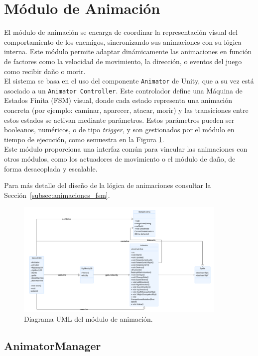 \section{Módulo de Animación} \label{sec:animation}

El módulo de animación se encarga de coordinar la representación visual del comportamiento de los enemigos, sincronizando sus animaciones con su lógica interna. Este módulo permite adaptar dinámicamente las animaciones en función de factores como la velocidad de movimiento, la dirección, o eventos del juego como recibir daño o morir.\\

El sistema se basa en el uso del componente \texttt{Animator} de Unity, que a su vez está asociado a un \texttt{Animator Controller}. Este controlador define una Máquina de Estados Finita (FSM) visual, donde cada estado representa una animación concreta (por ejemplo: caminar, aparecer, atacar, morir) y las transiciones entre estos estados se activan mediante parámetros. Estos parámetros pueden ser booleanos, numéricos, o de tipo \textit{trigger}, y son gestionados por el módulo en tiempo de ejecución, como semuestra en la Figura \ref{fig:UMLAnimation}.\\

Este módulo proporciona una interfaz común para vincular las animaciones con otros módulos, como los actuadores de movimiento o el módulo de daño, de forma desacoplada y escalable.

Para más detalle del diseño de la lógica de animaciones consultar la Sección~\ref{subsec:animaciones_fsm}.

\begin{figure}[t]
\centering
\includegraphics[width=0.9\textwidth]{Imagenes/UMLAnimator.png}
\caption{Diagrama UML del módulo de animación.}
\label{fig:UMLAnimation}
\end{figure}
\subsection{AnimatorManager}

